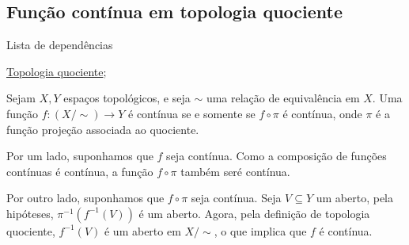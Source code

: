\subsection{Função contínua em topologia quociente}
\label{funcao-continua-em-topologia-quociente-prop}
\begin{titlemize}{Lista de dependências}
	\item \hyperref[topologia-quociente-def]{Topologia quociente}; 
\end{titlemize}

\begin{prop}
    Sejam \(X,Y\) espaços topológicos, e seja \(\sim\) uma relação de equivalência em \(X\). Uma função $f:(X/\sim) \longrightarrow Y$ é contínua se e somente se $f\circ \pi$ é contínua, onde $\pi$ é a função projeção associada ao quociente.
\end{prop}
\begin{dem}
    Por um lado, suponhamos que $f$ seja contínua. Como a composição de funções contínuas é contínua, a função $f\circ \pi$ também seré contínua.

    Por outro lado, suponhamos que $f\circ \pi$ seja contínua. Seja $V\subseteq Y$ um aberto, pela hipóteses, $\pi^{-1}(f^{-1}(V))$ é um aberto. Agora, pela definição de topologia quociente, $f^{-1}(V)$ é um aberto em $X/\sim$, o que implica que $f$ é contínua. 
\end{dem}
